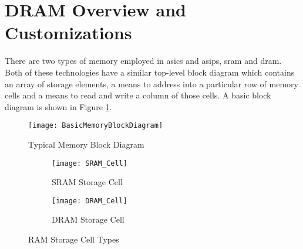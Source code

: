 
\section{DRAM Overview and Customizations}
\label{sec:DRAM Customizations}

There are two types of memory employed in \acp{asic} and \acp{asip}, \acf{sram} and \acf{dram}.
Both of these technologies have a similar top-level block diagram which contains an array of storage elements, a means to address into a particular row of memory cells and a means to read and write a column of those cells.
A basic block diagram is shown in Figure \ref{fig:MemoryBlockDiagram}.
\begin{figure}[h]
\centering
\captionsetup{justification=centering}
\centerline{
\mbox{\texttt{[image: BasicMemoryBlockDiagram]}}
}
\caption{Typical Memory Block Diagram \cite{Jacob:2007:MSC:1543376}}
\label{fig:MemoryBlockDiagram}
\end{figure}


\begin{figure}[h]
\centering
\begin{subfigure}{.45\textwidth}
  \centering
  \texttt{[image: SRAM\_Cell]}
  \captionsetup{justification=centering, skip=5pt}
  \vspace{-6pt}
  \caption{SRAM Storage Cell \cite{Jacob:2007:MSC:1543376}}
  \label{fig:SRAM Cell}
\end{subfigure}%
\begin{subfigure}{.45\textwidth}
  \centering
  \texttt{[image: DRAM\_Cell]}
  \captionsetup{justification=centering, skip=5pt}
  \vspace{20pt}
  \caption{DRAM Storage Cell \cite{Jacob:2007:MSC:1543376}}
  \label{fig:DRAM Cell}
\end{subfigure}
\captionsetup{justification=centering, skip=12pt}
\caption{RAM Storage Cell Types}
\label{fig:Memory Storage Cells}
\end{figure}


